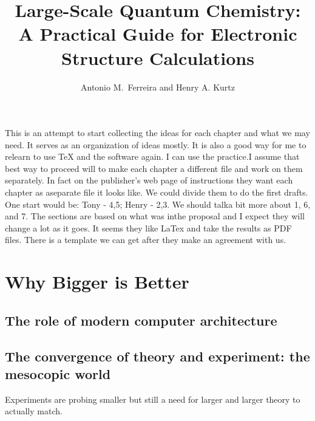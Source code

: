 \documentclass[oneside,12pt]{book}
\begin{document}
\title{Large-Scale Quantum Chemistry: A Practical Guide for Electronic
Structure Calculations}

\author{Antonio M.\ Ferreira and Henry A. Kurtz}





This is an attempt to start collecting the ideas for each chapter and
what we may need.  It serves as an organization of ideas mostly.  It
is also a good way for me to relearn to use TeX and the software
again.  I can use the practice.I assume that best way to proceed will
to make each chapter a different file and work on them separately.  In
fact on the publisher's web page of instructions they want each
chapter as aseparate file it looks like.  We could divide them to do
the first drafts.  One start would be: Tony - 4,5; Henry - 2,3.  We
should talka bit more about 1, 6, and 7.  The sections are based on
what was inthe proposal and I expect they will change a lot as it
goes. It seems they like LaTex and take the results as PDF files.
There is a template we can get after they make an agreement with us.

\chapter{Why Bigger is Better}
\section{The role of modern computer architecture}

\section{The convergence of theory and experiment: the mesocopic world}
Experiments are probing smaller but still a need for larger and larger
theory to actually match.
\end{document}
